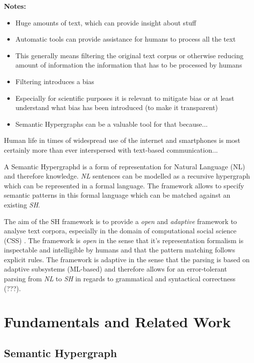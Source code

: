 \documentclass[11pt]{scrreprt}
\let\cite\parencite  %
\begin{document}
\textbf{Notes:}
\begin{itemize}
	\item Huge amounts of text, which can provide insight about stuff
	\item Automatic tools can provide assistance for humans to process all the text
	\item This generally means filtering the original text corpus or otherwise reducing amount of information the information that has to be processed by humans
	\item Filtering introduces a bias
	\item Especially for scientific purposes it is relevant to mitigate bias or at least understand what bias has been introduced (to make it transparent)
	\item Semantic Hypergraphs can be a valuable tool for that because...
\end{itemize}


Human life in times of widespread use of the internet and smartphones is most certainly more than ever interspersed with text-based communication...


A Semantic Hypergraphd \cite{menezes_semantic_2021} is a form of representation for Natural Language (NL) and therefore knowledge. \textit{NL} sentences can be modelled as a recursive hypergraph which can be represented in a formal language. The framework allows to specify semantic patterns in this formal language which can be matched against an existing \textit{SH}.

The aim of the SH framework is to provide a \textit{open} and \textit{adaptive} framework to analyse text corpora, especially in the domain of computational social science (CSS) \cite{lazer2009computational}. The framework is \textit{open} in the sense that it's representation formalism is inspectable and intelligible by humans and that the pattern matching follows explicit rules. The framework is adaptive in the sense that the parsing is based on adaptive subsystems (ML-based) and therefore allows for an error-tolerant parsing from \textit{NL} to \textit{SH} in regards to grammatical and syntactical correctness (???).




\chapter{Fundamentals and Related Work}
\section{Semantic Hypergraph}
\end{document}
